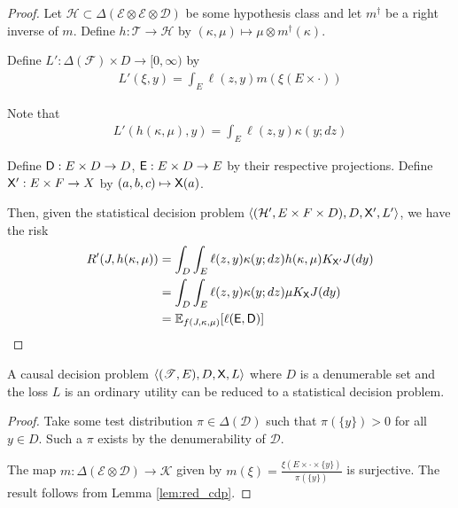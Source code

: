 \begin{proof}
Let $\mathcal{H}\subset \Delta(\mathcal{E}\otimes \mathcal{E}\otimes \mathcal{D})$ be some hypothesis class and let $m^\dagger$ be a right inverse of $m$. Define $h:\mathscr{T}\to \mathcal{H}$ by $(\kappa,\mu)\mapsto \mu \otimes m^{\dagger}(\kappa)$.

Define $L':\Delta(\mathcal{F})\times D\to [0,\infty)$ by
\begin{align}
    L'(\xi,y) = \int_E \ell(z,y) m(\xi(E\times \cdot))
\end{align}

Note that
\begin{align}
    L'(h(\kappa,\mu),y) = \int_E \ell(z,y) \kappa(y;dz)
\end{align}

Define $\mathsf{D}:E\times D\to D$, $\mathsf{E}:E\times D\to E$ by their respective projections. Define $\mathsf{X}':E\times F\to X$ by $(a,b,c)\mapsto \mathsf{X}(a)$.

Then, given the statistical decision problem $\langle(\mathcal{H}',E\times F\times D),D,\mathsf{X}',L'\rangle$, we have the risk
\begin{align}
    R'(J,h(\kappa,\mu)) &= \int_D \int_E \ell(z,y) \kappa(y;dz)  h(\kappa,\mu) K_{\mathsf{X}'} J(dy) \\
                  &= \int_D \int_E \ell(z,y) \kappa(y;dz) \mu K_{\mathsf{X}} J(dy)\\
                      &= \mathbb{E}_{f(J,\kappa,\mu)}[\ell(\mathsf{E},\mathsf{D})]
\end{align}
\end{proof}

\begin{theorem}\label{th:cdp_to_sdp}
A causal decision problem $\langle (\mathscr{T},E),D,\mathsf{X},L\rangle$ where $D$ is a denumerable set and the loss $L$ is an ordinary utility can be reduced to a statistical decision problem.
\end{theorem}

\begin{proof}
Take some test distribution $\pi\in \Delta(\mathcal{D})$ such that $\pi(\{y\})>0$ for all $y\in D$. Such a $\pi$ exists by the denumerability of $\mathcal{D}$.

The map $m:\Delta(\mathcal{E}\otimes\mathcal{D})\to \mathscr{K}$ given by $m(\xi) = \frac{\xi(E\times \cdot\times \{y\})}{\pi(\{y\})}$ is surjective. The result follows from Lemma \ref{lem:red_cdp}.

\end{proof}

